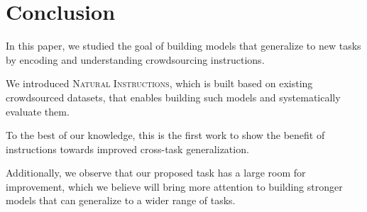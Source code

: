 \section{Conclusion}

\label{sec:discussion}
In this paper, we studied the goal of building models that  generalize to new tasks by encoding and understanding crowdsourcing instructions. 

We introduced \textsc{Natural Instructions}, which is built based on existing crowdsourced datasets,  that enables building such models and systematically evaluate them. 

To the best of our knowledge, this is the first work to show the benefit of instructions towards improved cross-task generalization. 

Additionally, we observe that our proposed task has a large room for improvement, which we believe will bring more attention to building stronger models that can generalize to a wider range of tasks.


